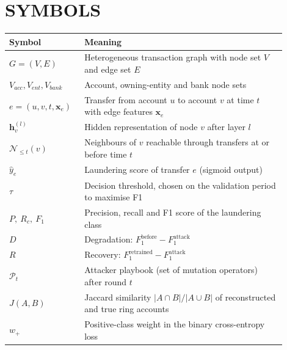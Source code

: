 \chapter*{SYMBOLS}

\begin{center}
\renewcommand{\arraystretch}{1.35}
\begin{tabular}{|p{0.22\linewidth}|p{0.68\linewidth}|}
\hline
\textbf{Symbol} & \textbf{Meaning} \\ \hline
$G=(V,E)$ & Heterogeneous transaction graph with node set $V$ and edge set $E$ \\ \hline
$V_{acc}, V_{ent}, V_{bank}$ & Account, owning-entity and bank node sets \\ \hline
$e=(u,v,t,\mathbf{x}_e)$ & Transfer from account $u$ to account $v$ at time $t$ with edge features $\mathbf{x}_e$ \\ \hline
$\mathbf{h}_v^{(l)}$ & Hidden representation of node $v$ after layer $l$ \\ \hline
$\mathcal{N}_{\le t}(v)$ & Neighbours of $v$ reachable through transfers at or before time $t$ \\ \hline
$\hat{y}_e$ & Laundering score of transfer $e$ (sigmoid output) \\ \hline
$\tau$ & Decision threshold, chosen on the validation period to maximise F1 \\ \hline
$P,\ R_c,\ F_1$ & Precision, recall and F1 score of the laundering class \\ \hline
$D$ & Degradation: $F_1^{\text{before}} - F_1^{\text{attack}}$ \\ \hline
$R$ & Recovery: $F_1^{\text{retrained}} - F_1^{\text{attack}}$ \\ \hline
$\mathcal{P}_t$ & Attacker playbook (set of mutation operators) after round $t$ \\ \hline
$J(A,B)$ & Jaccard similarity $|A\cap B|/|A\cup B|$ of reconstructed and true ring accounts \\ \hline
$w_+$ & Positive-class weight in the binary cross-entropy loss \\ \hline
\end{tabular}
\end{center}
